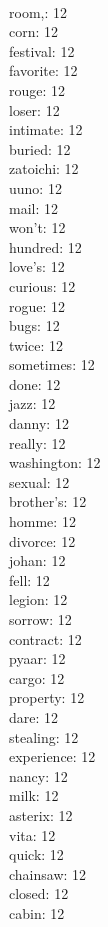\begin{multicols}{6}
  \\ room,: 12
  \\ corn: 12
  \\ festival: 12
  \\ favorite: 12
  \\ rouge: 12
  \\ loser: 12
  \\ intimate: 12
  \\ buried: 12
  \\ zatoichi: 12
  \\ uuno: 12
  \\ mail: 12
  \\ won't: 12
  \\ hundred: 12
  \\ love's: 12
  \\ curious: 12
  \\ rogue: 12
  \\ bugs: 12
  \\ twice: 12
  \\ sometimes: 12
  \\ done: 12
  \\ jazz: 12
  \\ danny: 12
  \\ really: 12
  \\ washington: 12
  \\ sexual: 12
  \\ brother's: 12
  \\ homme: 12
  \\ divorce: 12
  \\ johan: 12
  \\ fell: 12
  \\ legion: 12
  \\ sorrow: 12
  \\ contract: 12
  \\ pyaar: 12
  \\ cargo: 12
  \\ property: 12
  \\ dare: 12
  \\ stealing: 12
  \\ experience: 12
  \\ nancy: 12
  \\ milk: 12
  \\ asterix: 12
  \\ vita: 12
  \\ quick: 12
  \\ chainsaw: 12
  \\ closed: 12
  \\ cabin: 12

\end{multicols}
